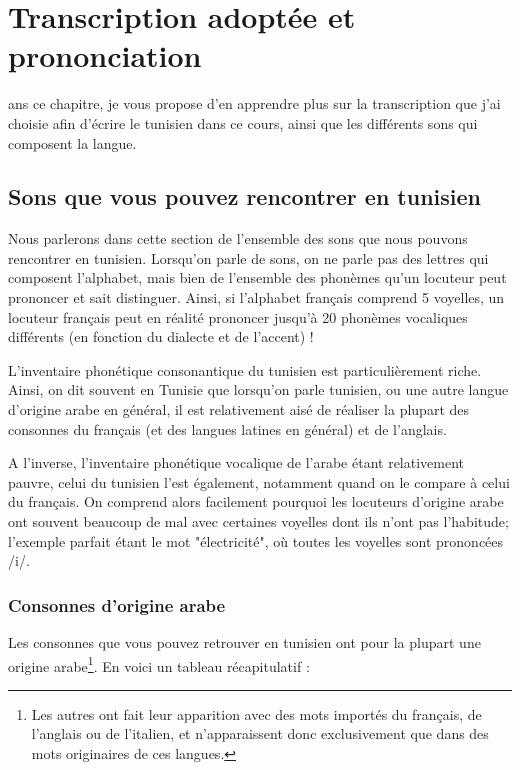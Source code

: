 \chapter{Transcription adoptée et prononciation}
ans ce chapitre, je vous propose d'en apprendre plus sur la transcription que j'ai choisie afin d'écrire le tunisien dans ce cours, ainsi que les différents sons qui composent la langue.

\section{Sons que vous pouvez rencontrer en tunisien}
Nous parlerons dans cette section de l'ensemble des sons que nous pouvons rencontrer en tunisien. Lorsqu'on parle de sons, on ne parle pas des lettres qui composent l'alphabet, mais bien de l'ensemble des phonèmes qu'un locuteur peut prononcer et sait distinguer. Ainsi, si l'alphabet français comprend 5 voyelles, un locuteur français peut en réalité prononcer jusqu'à 20 phonèmes vocaliques différents (en fonction du dialecte et de l'accent) !

L'inventaire phonétique consonantique du tunisien est particulièrement riche. Ainsi, on dit souvent en Tunisie que lorsqu'on parle tunisien, ou une autre langue d'origine arabe en général, il est relativement aisé de réaliser la plupart des consonnes du français (et des langues latines en général) et de l'anglais. 

A l'inverse, l'inventaire phonétique vocalique de l'arabe étant relativement pauvre, celui du tunisien l'est également, notamment quand on le compare à celui du français. On comprend alors facilement pourquoi les locuteurs d'origine arabe ont souvent beaucoup de mal avec certaines voyelles dont ils n'ont pas l'habitude; l'exemple parfait étant le mot "électricité", où toutes les voyelles sont prononcées /i/.

\subsection{Consonnes d'origine arabe}
Les consonnes que vous pouvez retrouver en tunisien ont pour la plupart une origine arabe\footnote{Les autres ont fait leur apparition avec des mots importés du français, de l'anglais ou de l'italien, et n'apparaissent donc exclusivement que dans des mots originaires de ces langues.}. En voici un tableau récapitulatif :

